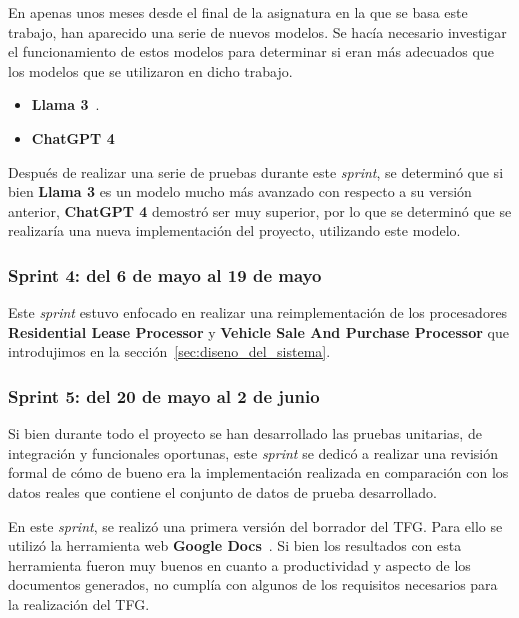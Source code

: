 En apenas unos meses desde el final de la asignatura en la que se basa este trabajo, han aparecido una serie de nuevos
modelos.
Se hacía necesario investigar el funcionamiento de estos modelos para determinar si eran más adecuados que los modelos
que se utilizaron en dicho trabajo.

\begin{itemize}
    \item \textbf{Llama 3}~\cite{https://ollama.com/library/llama3}.
    \item \textbf{ChatGPT 4}~\cite{https://platform.openai.com/docs/models/gpt-4}
\end{itemize}

Después de realizar una serie de pruebas durante este \textit{sprint}, se determinó que si bien \textbf{Llama 3} es un
modelo mucho más avanzado con respecto a su versión anterior, \textbf{ChatGPT 4} demostró ser muy superior, por lo que
se determinó que se realizaría una nueva implementación del proyecto, utilizando este modelo.

\subsubsection{Sprint 4: del 6 de mayo al 19 de mayo}

Este \textit{sprint} estuvo enfocado en realizar una reimplementación de los procesadores
\textbf{Residential Lease Processor} y \textbf{Vehicle Sale And Purchase Processor} que introdujimos en la
sección~\ref{sec:diseno_del_sistema}.

\subsubsection{Sprint 5: del 20 de mayo al 2 de junio}

Si bien durante todo el proyecto se han desarrollado las pruebas unitarias, de integración y funcionales oportunas, este
\textit{sprint} se dedicó a realizar una revisión formal de cómo de bueno era la implementación realizada en comparación
con los datos reales que contiene el conjunto de datos de prueba desarrollado.

En este \textit{sprint}, se realizó una primera versión del borrador del TFG. Para ello se utilizó la herramienta web
\textbf{Google Docs}~\cite{https://www.google.com/docs/about/}.
Si bien los resultados con esta herramienta fueron muy buenos en cuanto a productividad y aspecto de los documentos
generados, no cumplía con algunos de los requisitos necesarios para la realización del TFG.

